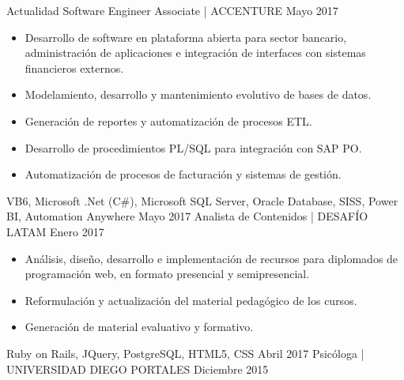 %
%
%
\begin{experiences}
  \experience
    {Actualidad}   {Software Engineer Associate | ACCENTURE}{}{} 
    {Mayo 2017} {
                      \begin{itemize}
                        \item Desarrollo de software en plataforma abierta para sector bancario, administración de aplicaciones e integración de interfaces con sistemas financieros externos.
                        \item Modelamiento, desarrollo y mantenimiento evolutivo de bases de datos. 
                        \item Generación de reportes y automatización de procesos ETL.
                        \item Desarrollo de procedimientos PL/SQL para integración con SAP PO.
                        \item Automatización de procesos de facturación y sistemas de gestión.
                      \end{itemize}
                    }
                    {VB6, Microsoft .Net (C\#), Microsoft SQL Server, Oracle Database, SISS, Power BI, Automation Anywhere}
  \emptySeparator
  \experience
    {Mayo 2017} {Analista de Contenidos | DESAFÍO LATAM}{}{}
    {Enero 2017}    {
                      \begin{itemize}
                        \item Análisis, diseño, desarrollo e implementación de recursos para diplomados de programación web, en formato presencial y semipresencial.
                        \item Reformulación y actualización del material pedagógico de los cursos.
                        \item Generación de material evaluativo y formativo.
                      \end{itemize}
                    }
                    {Ruby on Rails, JQuery, PostgreSQL, HTML5, CSS}
  \emptySeparator
  \experience
    {Abril 2017}     {Psicóloga | UNIVERSIDAD DIEGO PORTALES}{}{}
    {Diciembre 2015}    {
                      \begin{itemize}

\end{itemize}}
\end{experiences}
